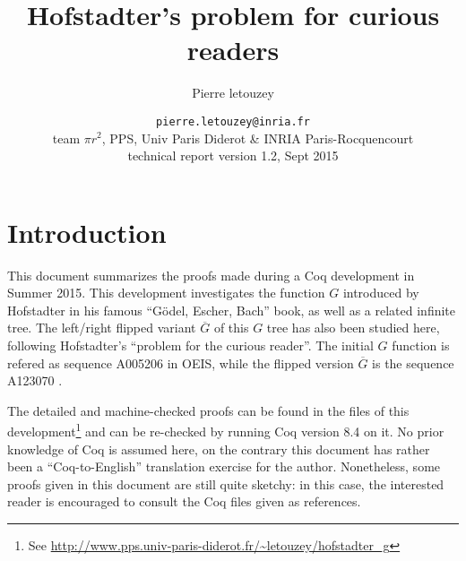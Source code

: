 \documentclass[a4paper,11pt]{article}
\title{Hofstadter's problem for curious readers}
\author{Pierre letouzey}
\date{\small
{\tt pierre.letouzey@inria.fr}\\
team $\pi r^2$, PPS, Univ Paris Diderot \& INRIA Paris-Rocquencourt\\
technical report version 1.2, Sept 2015
}
\begin{document}
\newtheorem{theorem}{Theorem}
\newtheorem{definition}{Definition}
\maketitle


\newcommand{\docgen}[2]{\href{http://www.pps.univ-paris-diderot.fr/~letouzey/hofstadter_g/doc/#1.html#2}{\tt #1.v}}
\newcommand{\doc}[1]{\docgen{#1}{}}
\newcommand{\doclab}[2]{\docgen{#1}{\##2}}
\newcommand{\FG}{\ensuremath{\overline{G}}}
\newcommand{\fibrest}{\ensuremath{\Sigma F_i}}

\section{Introduction}
This document summarizes the proofs made during a Coq development in
Summer 2015. This development investigates the function $G$ introduced
by Hofstadter in his famous ``Gödel, Escher, Bach'' book\cite{GEB},
as well as a related infinite tree. The left/right flipped variant
$\FG$ of this $G$ tree has also been studied here, following
Hofstadter's ``problem for the curious reader''.
The initial $G$ function is refered as sequence A005206 in
OEIS\cite{OEIS-G}, while the flipped version $\FG$ is the sequence
A123070 \cite{OEIS-FG}.

The detailed and machine-checked proofs can be found in the files
of this development\footnote{See
\url{http://www.pps.univ-paris-diderot.fr/~letouzey/hofstadter_g}}
and can be re-checked by running Coq \cite{Coq} version 8.4 on it.
No prior knowledge of Coq is assumed here, on the contrary this
document has rather been a ``Coq-to-English'' translation
exercise for the author. Nonetheless, some proofs given in this
document are still quite sketchy: in this case, the interested
reader is encouraged to consult the Coq files given as references.
\end{document}

